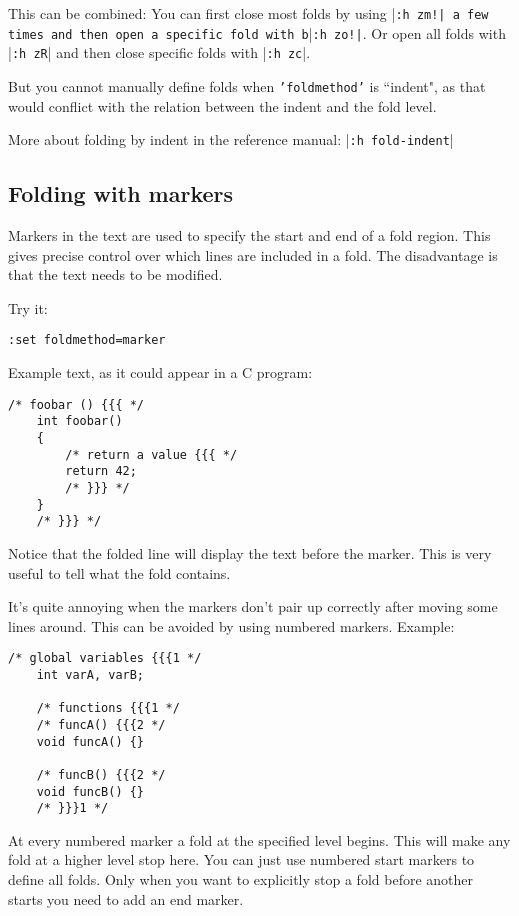 This can be combined: You can first close most folds by using |\texttt{:h zm!| a few times and then open a specific fold with b}|\texttt{:h zo!|}.
Or open all folds with |\texttt{:h zR}| and then close specific folds with |\texttt{:h zc}|.

But you cannot manually define folds when \texttt{'foldmethod'} is ``indent", as that would conflict with the relation between the indent and the fold level.

More about folding by indent in the reference manual: |\texttt{:h fold-indent}|
\subsection{Folding with markers}
Markers in the text are used to specify the start and end of a fold region.
This gives precise control over which lines are included in a fold.
The disadvantage is that the text needs to be modified.

Try it:

\begin{Verbatim}[samepage=true]
 :set foldmethod=marker
\end{Verbatim}

Example text, as it could appear in a C program:

\begin{Verbatim}[samepage=true]
    /* foobar () {{{ */
    int foobar()
    {
        /* return a value {{{ */
        return 42;
        /* }}} */
    }
    /* }}} */
\end{Verbatim}

Notice that the folded line will display the text before the marker.
This is very useful to tell what the fold contains.

It's quite annoying when the markers don't pair up correctly after moving some lines around.
This can be avoided by using numbered markers.
Example:

\begin{Verbatim}[samepage=true]
    /* global variables {{{1 */
    int varA, varB;

    /* functions {{{1 */
    /* funcA() {{{2 */
    void funcA() {}

    /* funcB() {{{2 */
    void funcB() {}
    /* }}}1 */
\end{Verbatim}

At every numbered marker a fold at the specified level begins.
This will make any fold at a higher level stop here.
You can just use numbered start markers to define all folds.
Only when you want to explicitly stop a fold before another starts you need to add an end marker.


